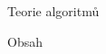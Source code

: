 \nopagenumbers

\tit Teorie algoritmů
\newpage

\nonum\notoc\sec Obsah
\maketoc
\newpage

\pagenumbers
